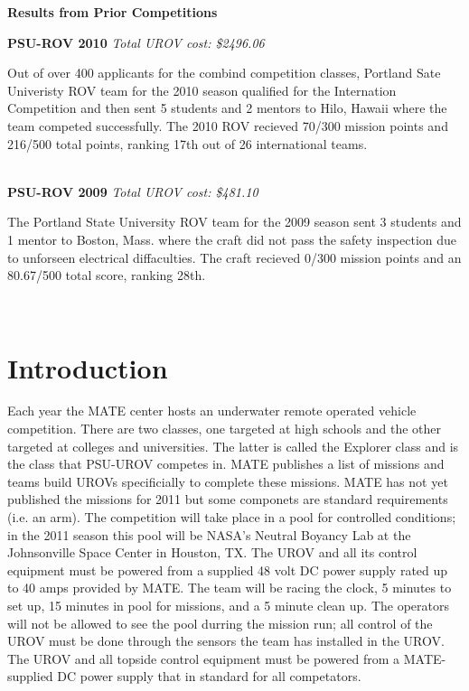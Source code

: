 \documentclass{proposalnsf}
\begin{document}
\newpage


\renewcommand{\thepage} {D--\arabic{page}}

\newpage

\centerline{\bf Results from Prior Competitions}

\noindent
{\bf PSU-ROV 2010}
{\it Total UROV cost: \$2496.06}

Out of over 400 applicants for the combind competition classes, Portland Sate Univeristy ROV team for the 2010 season qualified for the Internation Competition 
and then sent 5 students and 2 mentors to Hilo, Hawaii where the team competed successfully. The 2010 ROV recieved 70/300 mission points and 216/500 total points, 
ranking 17th out of 26 international teams.

\ \\
\noindent
{\bf PSU-ROV 2009}
{\it Total UROV cost: \$481.10}

The Portland State University ROV team for the 2009 season sent 3 students and 1 mentor to Boston, Mass. where the craft did not pass the safety inspection 
due to unforseen electrical diffaculties.  The craft recieved 0/300 mission points and an 80.67/500 total score, ranking 28th. 


\ \\

\section{Introduction}

Each year the MATE center hosts an underwater remote operated vehicle competition. There are two classes, one targeted at high schools and 
the other targeted at colleges and universities. The latter is called the Explorer class and is the class that PSU-UROV competes in. MATE 
publishes a list of missions and teams build UROVs specificially to complete these missions. MATE has not yet published the missions for 2011 
but some componets are standard requirements (i.e. an arm). The competition will take place in a pool for controlled conditions; in the 2011 
season this pool will be NASA's Neutral Boyancy Lab at the Johnsonville Space Center in Houston, TX. The UROV and all its control equipment 
must be powered from a supplied 48 volt DC power supply rated up to 40 amps provided by MATE. The team will be racing the clock, 
5 minutes to set up, 15 minutes in pool for missions, and a 5 minute clean up. The operators will not be allowed to see the pool durring the mission run; all 
control of the UROV must be done through the sensors the team has installed in the UROV. The UROV and all topside control equipment must be 
powered from a MATE-supplied DC power supply that in standard for all competators. 
\end{document}
